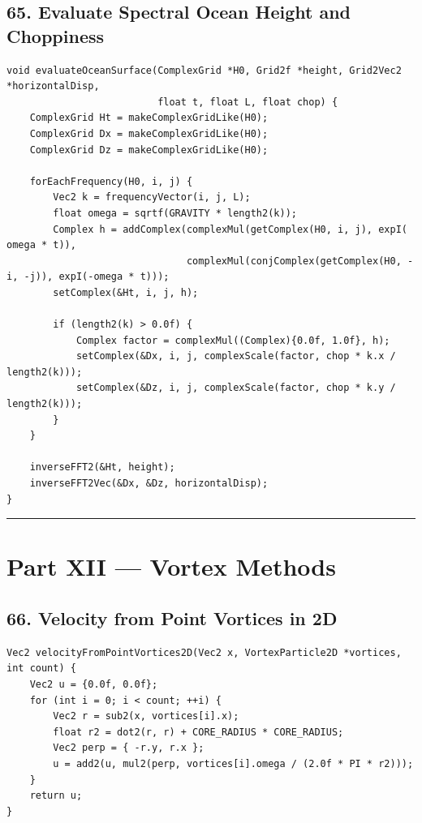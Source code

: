 \documentclass[10pt,letterpaper]{article}
\begin{document}
\subsection*{65. Evaluate Spectral Ocean Height and Choppiness}

\begin{verbatim}
void evaluateOceanSurface(ComplexGrid *H0, Grid2f *height, Grid2Vec2 *horizontalDisp,
                          float t, float L, float chop) {
    ComplexGrid Ht = makeComplexGridLike(H0);
    ComplexGrid Dx = makeComplexGridLike(H0);
    ComplexGrid Dz = makeComplexGridLike(H0);

    forEachFrequency(H0, i, j) {
        Vec2 k = frequencyVector(i, j, L);
        float omega = sqrtf(GRAVITY * length2(k));
        Complex h = addComplex(complexMul(getComplex(H0, i, j), expI( omega * t)),
                               complexMul(conjComplex(getComplex(H0, -i, -j)), expI(-omega * t)));
        setComplex(&Ht, i, j, h);

        if (length2(k) > 0.0f) {
            Complex factor = complexMul((Complex){0.0f, 1.0f}, h);
            setComplex(&Dx, i, j, complexScale(factor, chop * k.x / length2(k)));
            setComplex(&Dz, i, j, complexScale(factor, chop * k.y / length2(k)));
        }
    }

    inverseFFT2(&Ht, height);
    inverseFFT2Vec(&Dx, &Dz, horizontalDisp);
}
\end{verbatim}

\medskip\hrule\medskip

\clearpage
{}
\section*{Part XII --- Vortex Methods}

\subsection*{66. Velocity from Point Vortices in 2D}

\begin{verbatim}
Vec2 velocityFromPointVortices2D(Vec2 x, VortexParticle2D *vortices, int count) {
    Vec2 u = {0.0f, 0.0f};
    for (int i = 0; i < count; ++i) {
        Vec2 r = sub2(x, vortices[i].x);
        float r2 = dot2(r, r) + CORE_RADIUS * CORE_RADIUS;
        Vec2 perp = { -r.y, r.x };
        u = add2(u, mul2(perp, vortices[i].omega / (2.0f * PI * r2)));
    }
    return u;
}
\end{verbatim}
\end{document}
